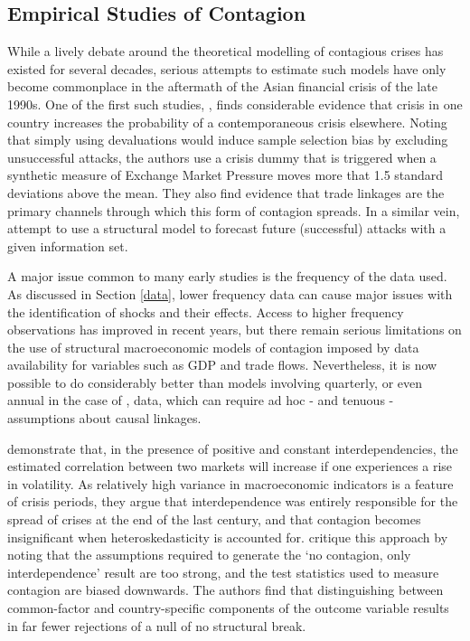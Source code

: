 \documentclass[../base.tex]{subfiles}
\begin{document}
\subsection{Empirical Studies of Contagion}

While a lively debate around the theoretical modelling of contagious crises has existed for several decades, serious attempts to estimate such models have only become commonplace in the aftermath of the Asian financial crisis of the late 1990s. One of the first such studies, \cite{eichengreen1996contagious}, finds considerable evidence that crisis in one country increases the probability of a contemporaneous crisis elsewhere. Noting that simply using devaluations would induce sample selection bias by excluding unsuccessful attacks, the authors use a crisis dummy that is triggered when a synthetic measure of Exchange Market Pressure moves more that 1.5 standard deviations above the mean. They also find evidence that trade linkages are the primary channels through which this form of contagion spreads. In a similar vein, \cite{esquivel1998explaining} attempt to use a structural model to forecast future (successful) attacks with a given information set.

A major issue common to many early studies is the frequency of the data used. As discussed in Section \ref{data}, lower frequency data can cause major issues with the identification of shocks and their effects. Access to higher frequency observations has improved in recent years, but there remain serious limitations on the use of structural macroeconomic models of contagion imposed by data availability for variables such as GDP and trade flows. Nevertheless, it is now possible to do considerably better than models involving quarterly, or even annual in the case of \cite{esquivel1998explaining}, data, which can require ad hoc - and tenuous - assumptions about causal linkages.

\cite{forbes2002no} demonstrate that, in the presence of positive and constant interdependencies, the estimated correlation between two markets will increase if one experiences a rise in volatility. As relatively high variance in macroeconomic indicators is a feature of crisis periods, they argue that interdependence was entirely responsible for the spread of crises at the end of the last century, and that contagion becomes insignificant when heteroskedasticity is accounted for. \cite{corsetti2005some} critique this approach by noting that the assumptions required to generate the `no contagion, only interdependence' result are too strong, and the test statistics used to measure contagion are biased downwards. The authors find that distinguishing between common-factor and country-specific components of the outcome variable results in far fewer rejections of a null of no structural break. 
\end{document}
